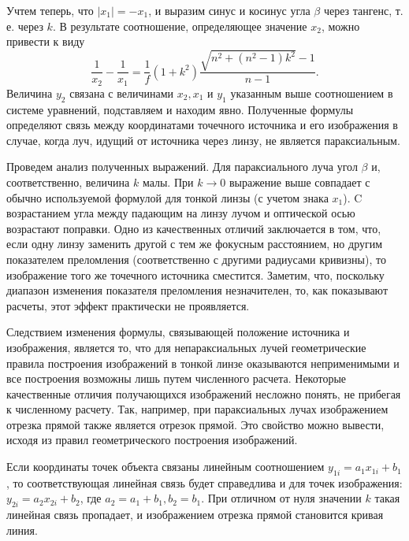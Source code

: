 \documentclass[a4paper,12pt]{article} %
\begin{document}
Учтем теперь, что $\left|x_{1}\right|=-x_{1}$, и выразим синус и косинус угла $\beta$ через тангенс, т. е. через $k$. В результате соотношение, определяющее значение $x_{2}$, можно привести к виду
$$
\frac{1}{x_{2}}-\frac{1}{x_{1}}=\frac{1}{f}\left(1+k^{2}\right) \frac{\sqrt{n^{2}+\left(n^{2}-1\right) k^{2}}-1}{n-1} .
$$
Величина $y_{2}$ связана с величинами $x_{2}, x_{1}$ и $y_{1}$ указанным выше соотношением в системе уравнений, подставляем и находим явно. Полученные формулы определяют связь между координатами точечного источника и его изображения в случае, когда луч, идущий от источника через линзу, не является параксиальным. 


Проведем анализ полученных выражений. Для параксиального луча угол $\beta$ и, соответственно, величина $k$ малы. При $k \rightarrow 0$ выражение выше совпадает с обычно используемой формулой для тонкой линзы (с учетом знака $x_{1}$). C возрастанием угла между падающим на линзу лучом и оптической осью возрастают поправки. Одно из качественных отличий заключается в том, что, если одну линзу заменить другой с тем же фокусным расстоянием, но другим показателем преломления (соответственно с другими радиусами кривизны), то изображение того же точечного источника сместится. Заметим, что, поскольку диапазон изменения показателя преломления незначителен, то, как показывают расчеты, этот эффект практически не проявляется.

Следствием изменения формулы, связывающей положение источника и изображения, является то, что для непараксиальных лучей геометрические правила построения изображений в тонкой линзе оказываются неприменимыми и все построения возможны лишь путем численного расчета. Некоторые качественные отличия получающихся изображений несложно понять, не прибегая к численному расчету. Так, например, при параксиальных лучах изображением отрезка прямой также является отрезок прямой. Это свойство можно вывести, исходя из правил геометрического построения изображений.

Если координаты точек объекта связаны линейным соотношением $y_{1 i}=a_{1} x_{1 i}+b_{1}$, то соответствующая линейная связь будет справедлива и для точек изображения: $y_{2 i}=a_{2} x_{2 i}+b_{2}$, где $a_{2}=a_{1}+b_{1}, b_{2}=b_{1}$. При отличном от нуля значении $k$ такая линейная связь пропадает, и изображением отрезка прямой становится кривая линия.
\end{document}
